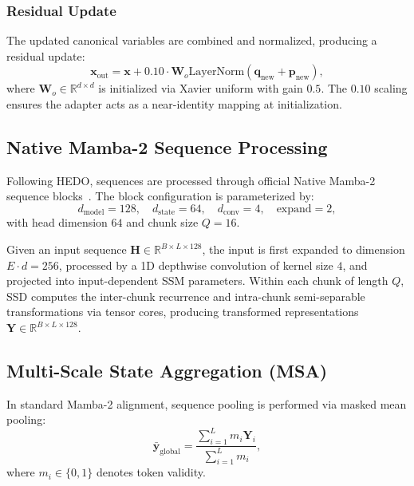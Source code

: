 \documentclass[10pt,journal,final]{IEEEtran}
\begin{document}
\subsubsection{Residual Update}
The updated canonical variables are combined and normalized, producing a residual update:
\begin{equation}
\label{eq:hedo_out}
\mathbf{x}_{\mathrm{out}} = \mathbf{x} + 0.10 \cdot \mathbf{W}_o \mathrm{LayerNorm}(\mathbf{q}_{\mathrm{new}} + \mathbf{p}_{\mathrm{new}}),
\end{equation}
where $\mathbf{W}_o \in \mathbb{R}^{d \times d}$ is initialized via Xavier uniform with gain $0.5$. The $0.10$ scaling ensures the adapter acts as a near-identity mapping at initialization.

\subsection{Native Mamba-2 Sequence Processing}
Following HEDO, sequences are processed through official Native Mamba-2 sequence blocks~\cite{dao2024transformers}. The block configuration is parameterized by:
\begin{equation}
\label{eq:mamba2_params}
d_{\mathrm{model}} = 128, \quad d_{\mathrm{state}} = 64, \quad d_{\mathrm{conv}} = 4, \quad \mathrm{expand} = 2,
\end{equation}
with head dimension $64$ and chunk size $Q = 16$. 

Given an input sequence $\mathbf{H} \in \mathbb{R}^{B \times L \times 128}$, the input is first expanded to dimension $E \cdot d = 256$, processed by a 1D depthwise convolution of kernel size $4$, and projected into input-dependent SSM parameters. Within each chunk of length $Q$, SSD computes the inter-chunk recurrence and intra-chunk semi-separable transformations via tensor cores, producing transformed representations $\mathbf{Y} \in \mathbb{R}^{B \times L \times 128}$.

\subsection{Multi-Scale State Aggregation (MSA)}
In standard Mamba-2 alignment, sequence pooling is performed via masked mean pooling:
\begin{equation}
\label{eq:global_mean}
\bar{\mathbf{y}}_{\mathrm{global}} = \frac{\sum_{i=1}^L m_i \mathbf{Y}_i}{\sum_{i=1}^L m_i},
\end{equation}
where $m_i \in \{0, 1\}$ denotes token validity.
\end{document}
